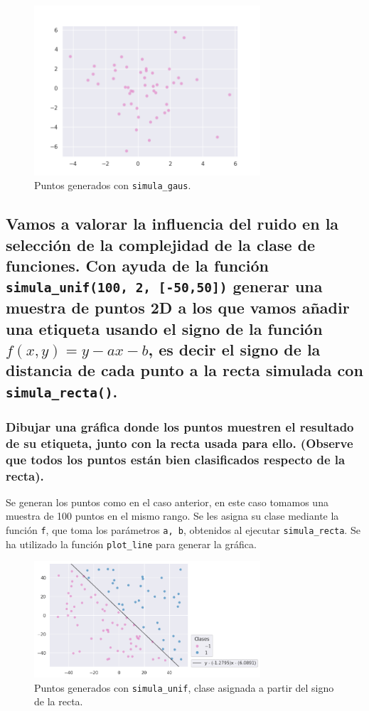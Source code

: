 \documentclass[a4paper, 20pt]{article}
\begin{document}
\begin{figure}[H]
    \centering
    \includegraphics[width=0.75\textwidth]{points1b}
    \caption{Puntos generados con \texttt{simula\_gaus}.}
    \label{fig:1b}
\end{figure}

\subsection{Vamos a valorar la influencia del ruido en la selección de la complejidad de la clase de funciones. Con ayuda de la función \texttt{simula\_unif(100, 2, [-50,50])} generar una muestra de puntos 2D a los que vamos añadir una etiqueta usando el signo de la función $f(x, y) = y - ax - b$, es decir el signo de la distancia de cada punto a la recta simulada con \texttt{simula\_recta()}.}
\subsubsection{Dibujar una gráfica donde los puntos muestren el resultado de su etiqueta, junto con la recta usada para ello. (Observe que todos los puntos están bien clasificados respecto de la recta).}

Se generan los puntos como en el caso anterior, en este caso tomamos una muestra de 100 puntos en el mismo rango. Se les asigna su clase mediante la función \texttt{f}, que toma los parámetros \texttt{a, b}, obtenidos al ejecutar \texttt{simula\_recta}. Se ha utilizado la función \texttt{plot\_line} para generar la gráfica.

\begin{figure}[H]
    \centering
    \includegraphics[width=0.75\textwidth]{recta}
    \caption{Puntos generados con \texttt{simula\_unif}, clase asignada a partir del signo de la recta.}
    \label{fig:recta}
\end{figure}
\end{document}
